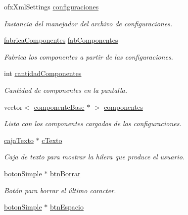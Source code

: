 \begin{DoxyCompactItemize}
\item 
ofx\+Xml\+Settings \hyperlink{classespacio_teclado_af215829331b2ed6d0a4485eab2a37311}{configuraciones}
\begin{DoxyCompactList}\small\item\em Instancia del manejador del archivo de configuraciones. \end{DoxyCompactList}\item 
\hyperlink{classfabrica_componentes}{fabrica\+Componentes} \hyperlink{classespacio_teclado_aaa53bfd0abe00de252f38c299174f0d1}{fab\+Componentes}
\begin{DoxyCompactList}\small\item\em Fabrica los componentes a partir de las configuraciones. \end{DoxyCompactList}\item 
int \hyperlink{classespacio_teclado_ac6f638174ab5143b45b5a0658f6782e9}{cantidad\+Componentes}
\begin{DoxyCompactList}\small\item\em Cantidad de componentes en la pantalla. \end{DoxyCompactList}\item 
vector$<$ \hyperlink{classcomponente_base}{componente\+Base} $\ast$ $>$ \hyperlink{classespacio_teclado_aad1549ce795db466bad7c47a5f82582c}{componentes}
\begin{DoxyCompactList}\small\item\em Lista con los componentes cargados de las configuraciones. \end{DoxyCompactList}\item 
\hyperlink{classcaja_texto}{caja\+Texto} $\ast$ \hyperlink{classespacio_teclado_ac4d882599a627a2d26aa19280fb1cf28}{c\+Texto}
\begin{DoxyCompactList}\small\item\em Caja de texto para mostrar la hilera que produce el usuario. \end{DoxyCompactList}\item 
\hyperlink{classboton_simple}{boton\+Simple} $\ast$ \hyperlink{classespacio_teclado_a68242d035fdf24a605e21d798ecf1a93}{btn\+Borrar}
\begin{DoxyCompactList}\small\item\em Botón para borrar el último caracter. \end{DoxyCompactList}\item 
\hyperlink{classboton_simple}{boton\+Simple} $\ast$ \hyperlink{classespacio_teclado_abf7bb12c95256d20e421831fea3d23e1}{btn\+Espacio}

\end{DoxyCompactItemize}
